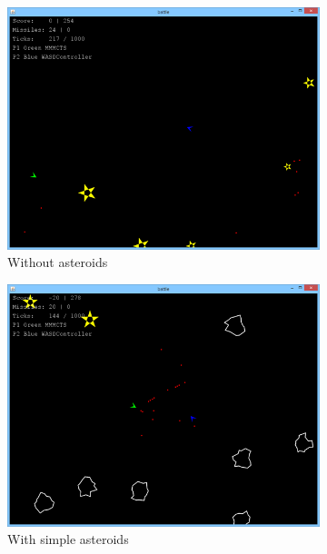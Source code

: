 \begin{figure}
	\centering
	\caption{Screenshots from the three game modes.}
	\begin{subfigure}[b]{0.3\textwidth}
		\center
		\includegraphics[scale=0.33]{resources/gamemode2}
		\caption{Without asteroids}
	\end{subfigure}
	\begin{subfigure}[b]{0.3\textwidth}
		\center
		\includegraphics[scale=0.33]{resources/gamemode1}
		\caption{With simple asteroids}
	\end{subfigure}
	\begin{subfigure}[b]{0.3\textwidth}
		\center

\end{subfigure}
\end{figure}

